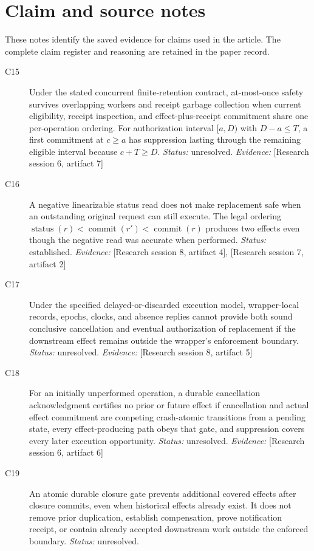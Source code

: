 \documentclass[11pt]{article}
\begin{document}
\section{Claim and source notes}
These notes identify the saved evidence for claims used in the article. The complete claim register and reasoning are retained in the paper record.
\begin{sloppypar}
\small
\begin{description}
\item[C15] Under the stated concurrent finite-retention contract, at-most-once safety survives overlapping workers and receipt garbage collection when current eligibility, receipt inspection, and effect-plus-receipt commitment share one per-operation ordering. For authorization interval $[a,D)$ with $D-a\leq T$, a first commitment at $c\geq a$ has suppression lasting through the remaining eligible interval because $c+T\geq D$. \textit{Status: }unresolved.
\textit{Evidence: }[Research session 6, artifact 7]
\item[C16] A negative linearizable status read does not make replacement safe when an outstanding original request can still execute. The legal ordering $\operatorname{status}(r)<\operatorname{commit}(r')<\operatorname{commit}(r)$ produces two effects even though the negative read was accurate when performed. \textit{Status: }established.
\textit{Evidence: }[Research session 8, artifact 4], [Research session 7, artifact 2]
\item[C17] Under the specified delayed-or-discarded execution model, wrapper-local records, epochs, clocks, and absence replies cannot provide both sound conclusive cancellation and eventual authorization of replacement if the downstream effect remains outside the wrapper's enforcement boundary. \textit{Status: }unresolved.
\textit{Evidence: }[Research session 8, artifact 5]
\item[C18] For an initially unperformed operation, a durable cancellation acknowledgment certifies no prior or future effect if cancellation and actual effect commitment are competing crash-atomic transitions from a pending state, every effect-producing path obeys that gate, and suppression covers every later execution opportunity. \textit{Status: }unresolved.
\textit{Evidence: }[Research session 6, artifact 6]
\item[C19] An atomic durable closure gate prevents additional covered effects after closure commits, even when historical effects already exist. It does not remove prior duplication, establish compensation, prove notification receipt, or contain already accepted downstream work outside the enforced boundary. \textit{Status: }unresolved.

\end{description}
\end{sloppypar}
\end{document}
